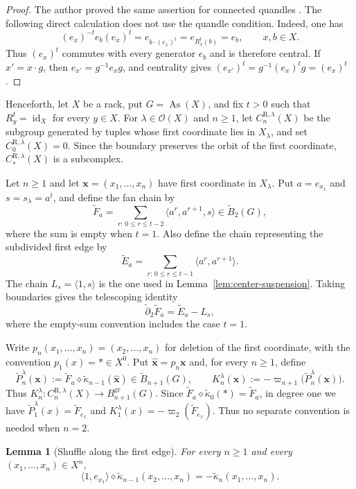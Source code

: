 \documentclass[11pt]{article}
\newtheorem{lemma}[theorem]{Lemma}
\DeclareMathOperator{\As}{As}
\newcommand{\OO}{\mathcal O}
\newcommand{\tB}{\widetilde B}
\newcommand{\tkap}{\widetilde\kappa}
\newcommand{\tF}{\widetilde F}
\newcommand{\tE}{\widetilde E}
\newcommand{\tP}{\widetilde P}
\newcommand{\td}{\widetilde\partial}
\newcommand{\gr}{\mathrm{gr}}
\newcommand{\R}{\mathrm R}
\begin{document}
\begin{proof}
The author proved the same assertion for connected quandles \cite[Lemma~3.5]{NosakaAdjoint}. The following direct calculation does not use the quandle condition. Indeed, %
one has 
\[ (e_x)^{-t}e_b(e_x)^t=e_{b\cdot(e_x)^t}=e_{R_x^t(b)}=e_b, \qquad x,b \in X .\]
Thus $(e_x)^t$ commutes with every generator $e_b$ and is therefore central. If $x'=x\cdot g$, then $e_{x'}=g^{-1}e_xg$, and centrality gives $(e_{x'})^t=g^{-1}(e_x)^tg=(e_x)^t$.
\end{proof}

Henceforth, let $X$ be a rack, put $G=\As(X)$, and fix $t>0$ such that
$R_y^t=\operatorname{id}_X$ for every $y\in X$. For
$\lambda\in\OO(X)$ and $n\ge1$, let $C_n^{\R,\lambda}(X)$ be the
subgroup generated by tuples whose first coordinate lies in $X_\lambda$,
and set $C_0^{\R,\lambda}(X)=0$. Since the boundary preserves the orbit of
the first coordinate, $C_*^{\R,\lambda}(X)$ is a subcomplex.

Let $n\ge1$ and let $\mathbf x=(x_1,\ldots,x_n)$ have first coordinate in $X_\lambda$. Put $a=e_{x_1}$ and $s=s_\lambda=a^t$, and define the fan chain by
\[
        \tF_a=
        \sum_{r:\,0\le r\le t-2}\langle a^r,a^{r+1},s\rangle
        \in \tB_2(G),
\]
where the sum is empty when $t=1$. Also define the chain representing the subdivided first edge by
\[
        \tE_a=\sum_{r:\,0\le r\le t-1}\langle a^r,a^{r+1}\rangle.
\]
The chain $L_s=\langle1,s\rangle$ is the one used in
Lemma~\ref{lem:center-suspension}. Taking boundaries gives the telescoping
identity
\begin{equation}
        \td_2\tF_a=\tE_a-L_s,
        \label{eq:fan-boundary}
\end{equation}
where the empty-sum convention includes the case $t=1$.

Write $p_n(x_1,\ldots,x_n)=(x_2,\ldots,x_n)$ for deletion of the first coordinate, with the convention $p_1(x)=*\in X^0$. Put $\widehat{\mathbf x}=p_n\mathbf x$ and, for every $n\ge1$, define
\[
 \tP_n^\lambda(\mathbf x)
 :=\tF_a\diamond\tkap_{n-1}(\widehat{\mathbf x})\in\tB_{n+1}(G),
 \qquad
 K_n^\lambda(\mathbf x):=-\varpi_{n+1}\bigl(\tP_n^\lambda(\mathbf x)\bigr).
\]
Thus $K_n^\lambda\colon C_n^{\R,\lambda}(X)\to B_{n+1}^{\gr}(G)$. Since $\tF_a\diamond\tkap_0(*)=\tF_a$, in degree one we have $\tP_1^\lambda(x)=\tF_{e_x}$ and $K_1^\lambda(x)=-\varpi_2(\tF_{e_x})$. Thus no separate convention is needed when $n=2$.

\begin{lemma}[Shuffle along the first edge]
\label{lem:first-edge-shuffle}
For every $n\ge1$ and every $(x_1,\ldots,x_n)\in X^n$,
\[
\langle1,e_{x_1}\rangle\diamond
 \tkap_{n-1}(x_2,\ldots,x_n)
 =-\tkap_n(x_1,\ldots,x_n).
\]
\end{lemma}
\end{document}
